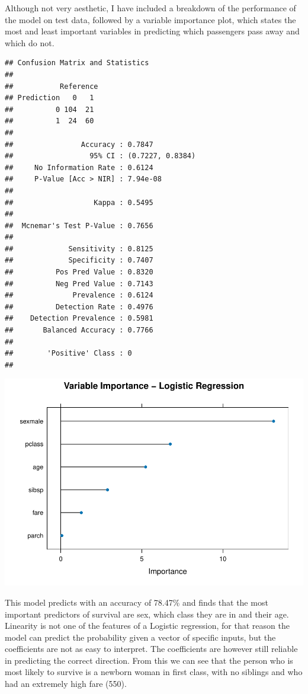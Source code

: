 \documentclass[
  11pt,
]{article}
\begin{document}
Although not very aesthetic, I have included a breakdown of the
performance of the model on test data, followed by a variable importance
plot, which states the most and least important variables in predicting
which passengers pass away and which do not.

\begin{verbatim}
## Confusion Matrix and Statistics
## 
##           Reference
## Prediction   0   1
##          0 104  21
##          1  24  60
##                                           
##                Accuracy : 0.7847          
##                  95% CI : (0.7227, 0.8384)
##     No Information Rate : 0.6124          
##     P-Value [Acc > NIR] : 7.94e-08        
##                                           
##                   Kappa : 0.5495          
##                                           
##  Mcnemar's Test P-Value : 0.7656          
##                                           
##             Sensitivity : 0.8125          
##             Specificity : 0.7407          
##          Pos Pred Value : 0.8320          
##          Neg Pred Value : 0.7143          
##              Prevalence : 0.6124          
##          Detection Rate : 0.4976          
##    Detection Prevalence : 0.5981          
##       Balanced Accuracy : 0.7766          
##                                           
##        'Positive' Class : 0               
## 
\end{verbatim}

\includegraphics{README_files/figure-latex/unnamed-chunk-8-1.pdf}

This model predicts with an accuracy of 78.47\% and finds that the most
important predictors of survival are sex, which class they are in and
their age. Linearity is not one of the features of a Logistic
regression, for that reason the model can predict the probability given
a vector of specific inputs, but the coefficients are not as easy to
interpret. The coefficients are however still reliable in predicting the
correct direction. From this we can see that the person who is most
likely to survive is a newborn woman in first class, with no siblings
and who had an extremely high fare (550).
\end{document}
